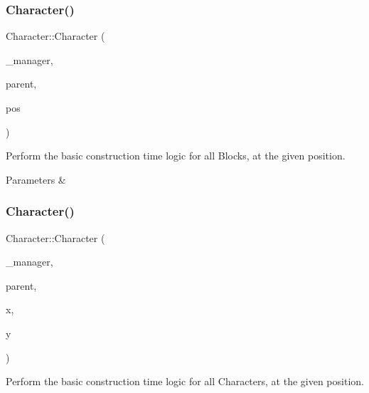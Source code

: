 \subsubsection{\texorpdfstring{Character()}{Character()}\hspace{0.1cm}{\footnotesize\ttfamily [2/3]}}
{\footnotesize\ttfamily Character\+::\+Character (\begin{DoxyParamCaption}\item[{\mbox{\hyperlink{class_game_manager}{Game\+Manager}} $\ast$}]{\+\_\+manager,  }\item[{\mbox{\hyperlink{class_game_entity}{Game\+Entity}} $\ast$}]{parent,  }\item[{\mbox{\hyperlink{classsf_1_1_vector2}{sf\+::\+Vector2f}}}]{pos }\end{DoxyParamCaption})\hspace{0.3cm}{\ttfamily [protected]}}



Perform the basic construction time logic for all Blocks, at the given position. 


\begin{DoxyParams}{Parameters}
{\em } & \\
\hline
\end{DoxyParams}
\mbox{\label{class_character_a443cbaba168bf9fe441db55a76c1b19c}} 
\subsubsection{\texorpdfstring{Character()}{Character()}\hspace{0.1cm}{\footnotesize\ttfamily [3/3]}}
{\footnotesize\ttfamily Character\+::\+Character (\begin{DoxyParamCaption}\item[{\mbox{\hyperlink{class_game_manager}{Game\+Manager}} $\ast$}]{\+\_\+manager,  }\item[{\mbox{\hyperlink{class_game_entity}{Game\+Entity}} $\ast$}]{parent,  }\item[{float}]{x,  }\item[{float}]{y }\end{DoxyParamCaption})\hspace{0.3cm}{\ttfamily [protected]}}



Perform the basic construction time logic for all Characters, at the given position. 


